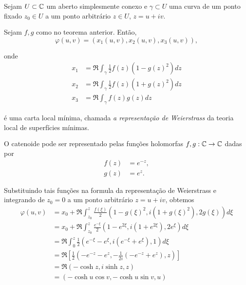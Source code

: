 \begin{defi}
	Sejam $U \subset \mathbb{C}$ um aberto simplesmente conexo e $\gamma \subset U$ uma curva de um ponto fixado $z_0 \in U$ a um ponto arbitrário $z \in U$, $z = u + iv$.
	
	Sejam $f,g$ como no teorema anterior. Então,
	\begin{equation*}
		\varphi(u,v) = (x_1(u,v), x_2(u,v), x_3(u,v)),
	\end{equation*}
	
	onde
	\begin{align*}
		x_1 &= \Re \int_{\gamma} \frac{1}{2} f(z) (1 - g(z)^2) dz\\
		x_2 &= \Re \int_{\gamma} \frac{1}{2} f(z) (1 + g(z)^2) dz\\
		x_3 &= \Re \int_{\gamma} f(z) g(z) dz
	\end{align*}
	
	é uma carta local mínima, chamada \emph{a representação de Weierstrass} da teoria local de superfícies mínimas.
\end{defi}

\begin{exemplo}[Catenoide]
	O catenoide pode ser representado pelas funções holomorfas $f, g: \mathbb{C} \rightarrow \mathbb{C}$ dadas por
	\begin{align*}
		f(z) &= e^{-z},\\
		g(z) &= e^z.
	\end{align*}
	
	Substituindo tais funções na formula da representação de Weierstrass e integrando de $z_0 = 0$ a um ponto arbitrário $z = u + iv$, obtemos
	\begin{align*}
		\varphi(u,v) &= x_0 + \Re \int_{z_0}^{z} \frac{f(\xi)}{2} (1 - g(\xi)^2, i (1 + g(\xi)^2), 2 g(\xi)) d\xi\\
		&= x_0 + \Re \int_{z_0}^{z} \frac{e^{-\xi}}{2} (1 - e^{2\xi}, i (1 + e^{2\xi}), 2e^{\xi}) d\xi\\
		&= \Re \int_{0}^{z} \frac{1}{2} (e^{-\xi} - e^{\xi}, i (e^{-\xi} + e^{\xi}), 1) d\xi\\
		&= \Re \left[ \frac{1}{2} \left(-e^{-z} - e^z, -\frac{1}{2i} (-e^{-z} + e^z), z \right) \right] \\
		&= \Re \left( -\cosh z, i \sinh z, z \right) \\
		&= \left( -\cosh u \cos v, -\cosh u \sin v, u \right)
	\end{align*} 
\end{exemplo}

